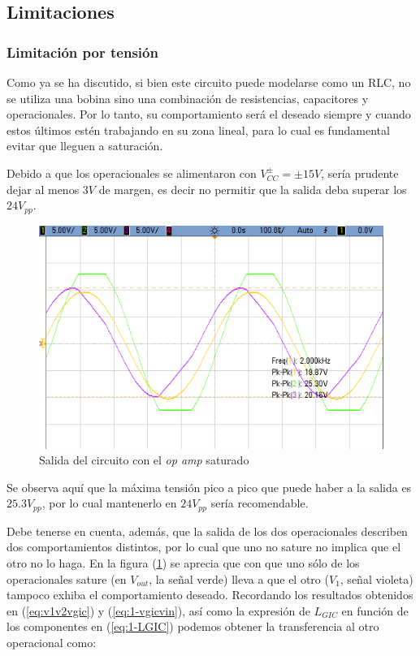 \documentclass[../../tc_tp3_main.tex]{subfiles}
\begin{document}
\subsection{Limitaciones}

\subsubsection{Limitaci\'on por tensi\'on}

Como ya se ha discutido, si bien este circuito puede modelarse como un RLC, no se utiliza una bobina sino una combinaci\'on de resistencias, capacitores y operacionales. Por lo tanto, su comportamiento ser\'a el deseado siempre y cuando estos \'ultimos est\'en trabajando en su zona lineal, para lo cual es fundamental evitar que lleguen a saturaci\'on. \par

Debido a que los operacionales se alimentaron con $V_{CC}^\pm = \pm 15V$, ser\'ia prudente dejar al menos $3V$ de margen, es decir no permitir que la salida deba superar los $24V_{pp}$. 

\begin{figure}[H]
	\centering
  	\includegraphics[scale = 0.3]{imagenes/tc_tp3_ej1_saturacion.png}
  	\caption{Salida del circuito con el \textit{op amp} saturado}
  	\label{fig:1-saturacion}
\end{figure}

Se observa aqu\'i que la m\'axima tensi\'on pico a pico que puede haber a la salida es $25.3V_{pp}$, por lo cual mantenerlo en $24V_{pp}$ ser\'ia recomendable.\par

Debe tenerse en cuenta, adem\'as, que la salida de los dos operacionales describen dos comportamientos distintos, por lo cual que uno no sature no implica que el otro no lo haga. En la figura (\ref{fig:1-saturacion}) se aprecia que con que uno s\'olo de los operacionales sature (en $V_{out}$, la se\~nal verde) lleva a que el otro ($V_1$, se\~nal violeta) tampoco exhiba el comportamiento deseado. Recordando los resultados obtenidos en (\ref{eq:v1v2vgic}) y (\ref{eq:1-vgicvin}), as\'i como la expresi\'on de $L_{GIC} $ en funci\'on de los componentes en (\ref{eq:1-LGIC}) podemos obtener la transferencia al otro operacional como:
\end{document}
